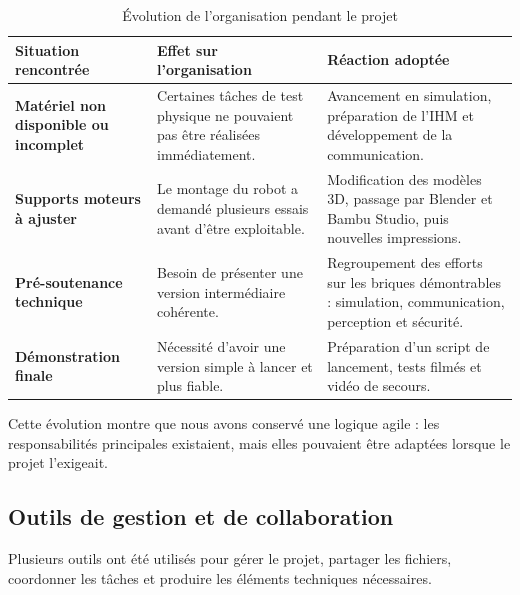 \documentclass[11pt,a4paper]{report}
\begin{document}
\begin{table}[H]
\centering
\small
\renewcommand{\arraystretch}{1.25}
\begin{tabular}{|p{4cm}|p{5.3cm}|p{5.3cm}|}
\hline
\textbf{Situation rencontrée} & \textbf{Effet sur l'organisation} & \textbf{Réaction adoptée} \\
\hline
\textbf{Matériel non disponible ou incomplet} &
Certaines tâches de test physique ne pouvaient pas être réalisées immédiatement. &
Avancement en simulation, préparation de l'IHM et développement de la communication. \\
\hline
\textbf{Supports moteurs à ajuster} &
Le montage du robot a demandé plusieurs essais avant d'être exploitable. &
Modification des modèles 3D, passage par Blender et Bambu Studio, puis nouvelles impressions. \\
\hline
\textbf{Pré-soutenance technique} &
Besoin de présenter une version intermédiaire cohérente. &
Regroupement des efforts sur les briques démontrables : simulation, communication, perception et sécurité. \\
\hline
\textbf{Démonstration finale} &
Nécessité d'avoir une version simple à lancer et plus fiable. &
Préparation d'un script de lancement, tests filmés et vidéo de secours. \\
\hline
\end{tabular}
\caption{Évolution de l'organisation pendant le projet}
\label{tab:evolution_repartition}
\end{table}

Cette évolution montre que nous avons conservé une logique agile : les responsabilités principales existaient, mais elles pouvaient être adaptées lorsque le projet l'exigeait.

\subsection{Outils de gestion et de collaboration}

Plusieurs outils ont été utilisés pour gérer le projet, partager les fichiers, coordonner les tâches et produire les éléments techniques nécessaires.
\end{document}
